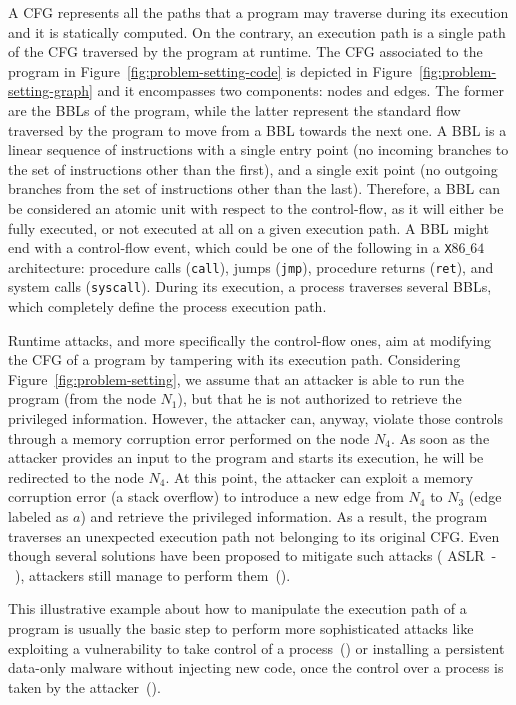 A CFG represents all the paths that a program
may traverse during its execution and it is statically computed. 
On the contrary, an execution path is a single path of the CFG traversed by the 
program at runtime. 
The CFG associated to the program in Figure~\ref{fig:problem-setting-code} is 
depicted in
Figure~\ref{fig:problem-setting-graph} and it encompasses two components: nodes 
and edges. The former are the BBLs of the program, while the latter represent 
the standard flow traversed by the program to move from a BBL towards the next 
one. A BBL is a linear sequence of instructions with a single entry point
(\ie no incoming branches to the set of instructions other than the first), 
and a single exit point (\ie no outgoing branches from the set of instructions 
other than the last). Therefore, a BBL can be considered an atomic unit with 
respect to the control-flow, as it will either be fully executed, or not 
executed at all on a given execution path.
A BBL might end with a control-flow event, which could be one of the following 
in a \texttt{X$86\_64$} architecture: procedure calls (\eg \texttt{call}), 
jumps (\eg \texttt{jmp}), procedure returns (\eg \texttt{ret}), and system 
calls (\eg \texttt{syscall}). 
During its execution, a process traverses several BBLs, which completely define 
the process execution path.

Runtime attacks, and more specifically the control-flow ones, aim at modifying 
the CFG of a program by tampering with its execution path.
Considering Figure~\ref{fig:problem-setting}, we assume that an attacker is 
able to run the program (from the node $N_1$), but that he is not authorized to 
retrieve the privileged information.
However, the attacker can, anyway, violate those controls through a memory 
corruption error performed on the node $N_4$.
As soon as the attacker provides an input to the program and starts its 
execution, he will be redirected to the node $N_4$.
At this point, the attacker can exploit a memory corruption error (\eg a stack 
overflow) to introduce a new edge from $N_4$ to $N_3$ (edge labeled as $a$) and 
retrieve the privileged information.
As a result, the program traverses an unexpected execution path not belonging 
to its original CFG.
Even though several solutions have been proposed to mitigate such attacks (\eg 
ASLR~-~\cite{kil2006address}), attackers still manage to perform 
them~(\cite{van2012memory}). 

This illustrative example about how to manipulate the execution path of a 
program is usually the basic step to perform more sophisticated attacks like
exploiting a vulnerability to take control of a 
process~(\cite{yuan2015hardware}) 
or installing a persistent data-only malware without injecting new code, 
once the control over a process is taken by the 
attacker~(\cite{vogl2014persistent}).

